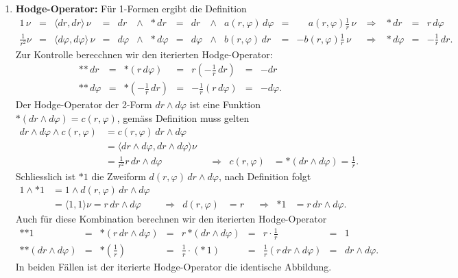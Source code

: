 \begin{enumerate}
\[\begin{matrix}
\langle d\varphi, dr \rangle & \langle d\varphi,d\varphi\rangle
\end{matrix}
\right|
=
\left|
\begin{matrix}
1&0\\
0&\frac{1}{r^2}
\end{matrix}
\right|
=
\frac{1}{r^2}
\]
gegeben.
\item{\bf Hodge-Operator:}
Für 1-Formen ergibt die Definition
\[
\renewcommand{\arraycolsep}{1.5pt}
\begin{array}{rcrcrclcrclclcrcl}
1\,\nu
&=&
\langle dr,dr\rangle\,\nu
&=&
dr &\wedge& {\ast\,dr}
&=&
dr &\wedge& a(r,\varphi)\,d\varphi
&=&
\phantom{-}a(r,\varphi)
\frac1r
\, \nu
&\;\Rightarrow\;&
\ast\,dr
&=&
r\,d\varphi
\\
\frac{1}{r^2}\nu
&=&
\langle d\varphi,d\varphi\rangle\,\nu
&=&
d\varphi &\wedge& {\ast\,d\varphi}
&=&
d\varphi &\wedge& b(r,\varphi)\,dr
&=&
-b(r,\varphi)\frac{1}{r}\,\nu
&\;\Rightarrow\;&
\ast\,d\varphi
&=&
-\frac1r\, dr.
\end{array}
\]
Zur Kontrolle berecchnen wir den iterierten Hodge-Operator:
\[
\renewcommand{\arraycolsep}{1.5pt}
\begin{array}{rclclcl}
\ast{\ast\,dr}
&=&
\ast(r\,d\varphi)
&=&
r(-\frac1r\,dr)
&=&
-dr
\\
\ast{\ast\,d\varphi}
&=&
\ast(-\frac1{r}\,dr)
&=&
-\frac1r(r\, d\varphi)
&=&
-d\varphi.
\end{array}
\]
Der Hodge-Operator der 2-Form $dr\wedge d\varphi$ ist eine Funktion
$\ast(dr\wedge d\varphi)=c(r,\varphi)$, gemäss Definition muss gelten
\begin{align*}
dr\wedge d\varphi\wedge c(r,\varphi)
&=
c(r,\varphi)\,dr\wedge d\varphi
\\
&=
\langle dr\wedge d\varphi,dr\wedge d\varphi\rangle \nu
\\
&=
\frac{1}{r^2} r\,dr\wedge d\varphi
&&\Rightarrow&
c(r,\varphi)
&=
\ast(dr\wedge d\varphi)
=
\frac1r.
\end{align*}
Schliesslich ist $\ast 1$ die Zweiform $d(r,\varphi)\,dr\wedge d\varphi$,
nach Definition folgt
\begin{align*}
1\wedge{\ast 1}
&=
1\wedge d(r,\varphi)\,dr\wedge d\varphi
\\
&=
\langle 1,1\rangle \nu
=
r\,dr\wedge d\varphi
&&\Rightarrow&
d(r,\varphi)
&=
r
&&\Rightarrow&
\ast 1
&=
r\,dr\wedge d\varphi.
\end{align*}
Auch für diese Kombination berechnen wir den iterierten Hodge-Operator
\[
\renewcommand{\arraycolsep}{1.5pt}
\begin{array}{rclclclcl}
\ast{\ast 1}
&=&
\ast (r\,dr\wedge d\varphi)
&=&
r\,{\ast(dr\wedge d\varphi)}
&=&
r\cdot\frac1r
&=&
1
\\
\ast{\ast(dr\wedge d\varphi)}
&=&
\ast(\frac1r)
&=&
\frac1r\cdot({\ast\, 1})
&=&
\frac1r(r\,dr\wedge d\varphi)
&=&
dr\wedge d\varphi.
\end{array}
\]
In beiden Fällen ist der iterierte Hodge-Operator die identische
Abbildung.
\end{enumerate}

